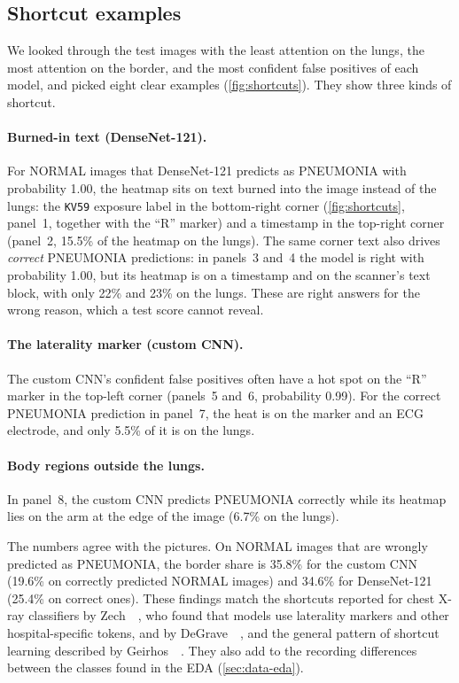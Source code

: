 \subsection{Shortcut examples}
\label{sec:gradcam-shortcuts}
We looked through the test images with the least attention on the lungs, the most attention on the border, and the most confident false positives of each model,
and picked eight clear examples (\cref{fig:shortcuts}). They show three kinds of shortcut.

\paragraph{Burned-in text (DenseNet-121).}
For NORMAL images that DenseNet-121 predicts as PNEUMONIA with probability 1.00, the heatmap sits on text burned into the image instead of the lungs:
the \texttt{KV59} exposure label in the bottom-right corner (\cref{fig:shortcuts}, panel~1, together with the ``R'' marker) and a timestamp in the top-right corner (panel~2, 15.5\% of the heatmap on the lungs).
The same corner text also drives \emph{correct} PNEUMONIA predictions: in panels~3 and~4 the model is right with probability 1.00, but its heatmap is on a timestamp and on the scanner's text block,
with only 22\% and 23\% on the lungs. These are right answers for the wrong reason, which a test score cannot reveal.

\paragraph{The laterality marker (custom CNN).}
The custom CNN's confident false positives often have a hot spot on the ``R'' marker in the top-left corner (panels~5 and~6, probability 0.99).
For the correct PNEUMONIA prediction in panel~7, the heat is on the marker and an ECG electrode, and only 5.5\% of it is on the lungs.

\paragraph{Body regions outside the lungs.}
In panel~8, the custom CNN predicts PNEUMONIA correctly while its heatmap lies on the arm at the edge of the image (6.7\% on the lungs).

The numbers agree with the pictures. On NORMAL images that are wrongly predicted as PNEUMONIA, the border share is 35.8\% for the custom CNN (19.6\% on correctly predicted NORMAL images)
and 34.6\% for DenseNet-121 (25.4\% on correct ones).
These findings match the shortcuts reported for chest X-ray classifiers by Zech~\etal~\cite{zech2018variable}, who found that models use laterality markers and other hospital-specific tokens,
and by DeGrave~\etal~\cite{degrave2021ai}, and the general pattern of shortcut learning described by Geirhos~\etal~\cite{geirhos2020shortcut}.
They also add to the recording differences between the classes found in the EDA (\cref{sec:data-eda}).

